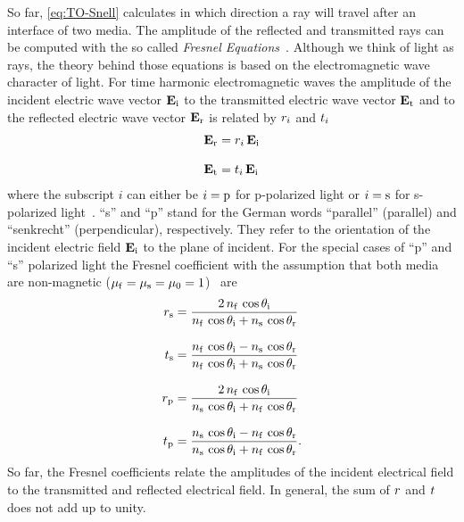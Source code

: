 So far, \cref{eq:TO-Snell} calculates in which direction a ray will travel 
after an interface of two media. The amplitude of the reflected and transmitted 
rays can be computed with the so called \emph{Fresnel 
Equations}~\cite{Jackson2013,Born1980Ch1}. Although we think of light as rays, 
the theory behind those equations is based on the electromagnetic wave 
character of light. For time harmonic electromagnetic waves the amplitude of 
the incident electric wave vector $\vb{E}_{\mathrm{i}}$ to the transmitted electric 
wave vector $\vb{E}_{\mathrm{t}}$ and to the reflected electric wave vector 
$\vb{E}_{\mathrm{r}}$ is related by $r_{i}$ and $t_{i}$
\begin{subequations}
\begin{align}
  \vb{E}_{\mathrm{r}} & =r_{i}\,\vb{E}_{\mathrm{i}} \\[3mm]
  \vb{E}_{\mathrm{t}} & =t_{i}\,\vb{E}_{\mathrm{i}}
\end{align}
\end{subequations}
where the subscript $i$ can either be $i=\mathrm{p}$ for p-polarized light or 
$i=\mathrm{s}$ for s-polarized light~\cite{Jackson2013,Born1980Ch1}. ``s'' and 
``p'' stand for the German words ``parallel'' (parallel) and ``senkrecht'' 
(perpendicular), respectively. They refer to the orientation of the incident 
electric field $\vb{E}_{\mathrm{i}}$ to the plane of incident. For the special 
cases of ``p'' and ``s'' polarized light the Fresnel coefficient with the 
assumption that both media are non-magnetic ($\mu_{\mathrm{f}} = \mu_{\mathrm{s}} = 
\mu_{0} = 1$)~\cite{Born1980Ch1} are
\begin{subequations}
\begin{align}
  r_{\mathrm{s}} & =
  \frac{2\,n_{\mathrm{f}}\,\cos\theta_{\mathrm{i}}}{n_{\mathrm{f}}\,\cos\theta_{\mathrm{i}} + n_{\mathrm{s}}\,\cos\theta_{\mathrm{r}}} 
  \label{eq:TO-fresnel-rs}\\[3mm]
  t_{\mathrm{s}} & = \frac{n_{\mathrm{f}}\,\cos\theta_{\mathrm{i}} - 
  n_{\mathrm{s}}\,\cos\theta_{\mathrm{r}}}{n_{\mathrm{f}}\,\cos\theta_{\mathrm{i}} + n_{\mathrm{s}}\,\cos\theta_{\mathrm{r}}} 
  \label{eq:TO-fresnel-ts}\\[3mm]
  r_{\mathrm{p}} & =
  \frac{2\,n_{\mathrm{f}}\,\cos\theta_{\mathrm{i}}}{n_{\mathrm{s}}\,\cos\theta_{\mathrm{i}} + n_{\mathrm{f}}\,\cos\theta_{\mathrm{r}}} 
  \label{eq:TO-fresnel-rp}\\[3mm]
  t_{\mathrm{p}} & = \frac{n_{\mathrm{s}}\,\cos\theta_{\mathrm{i}} - 
  n_{\mathrm{f}}\,\cos\theta_{\mathrm{r}}}{n_{\mathrm{s}}\,\cos\theta_{\mathrm{i}} + n_{\mathrm{f}}\,\cos\theta_{\mathrm{r}}}.
\label{eq:TO-fresnel-tp}
\end{align}
\end{subequations}
So far, the Fresnel coefficients relate the amplitudes of the incident 
electrical field to the transmitted and reflected electrical field. In general, 
the sum of $r$ and $t$ does not add up to unity.

